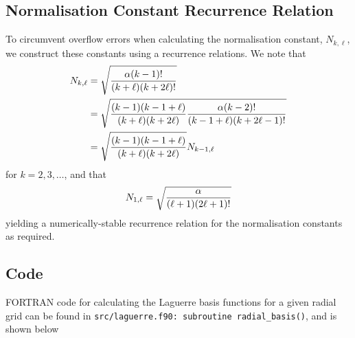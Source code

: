 \documentclass[]{article}
\begin{document}
\subsection{Normalisation Constant Recurrence Relation}
\label{sec:norm-const}

To circumvent overflow errors when calculating the normalisation constant,
$N_{k, \ell}$, we construct these constants using a recurrence relations.
We note that
\begin{alignat*}{2}
  N_{k, \ell}
  {}={}
  &
  \sqrt
  {
    \dfrac
    {
      \alpha
      (k - 1)!
    }
    {
      (k + \ell)
      (k + 2\ell)!
    }
  }
  \\
  {}={}
  &
  \sqrt
  {
    \dfrac
    {
      (k - 1)
      (k - 1 + \ell)
    }
    {
      (k + \ell)
      (k + 2\ell)
    }
    \dfrac
    {
      \alpha
      (k - 2)!
    }
    {
      (k - 1 + \ell)
      (k + 2\ell - 1)!
    }
  }
  \\
  {}={}
  &
  \sqrt
  {
    \dfrac
    {
      (k - 1)
      (k - 1 + \ell)
    }
    {
      (k + \ell)
      (k + 2\ell)
    }
  }
  N_{k - 1, \ell}
\end{alignat*}
for $k = 2, 3, \dotsc$, and that
\begin{equation*}
  N_{1, \ell}
  =
  \sqrt
  {
    \dfrac
    {
      \alpha
    }
    {
      (\ell + 1)
      (2\ell + 1)!
    }
  }
\end{equation*}
yielding a numerically-stable recurrence relation for the normalisation
constants as required.

\subsection{Code}
\label{sec:code}

FORTRAN code for calculating the Laguerre basis functions for a given radial
grid can be found in
\lstinline[style=ff]{src/laguerre.f90: }\lstinline{subroutine radial_basis()},
and is shown below






\end{document}
